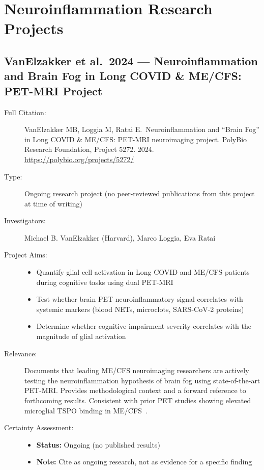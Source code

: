 \section{Neuroinflammation Research Projects}
\label{sec:bib-neuroinflammation-projects-2026}

\subsection{VanElzakker et al.\ 2024 --- Neuroinflammation and Brain Fog in Long COVID \& ME/CFS: PET-MRI Project}

\begin{description}
    \item[Full Citation:] VanElzakker MB, Loggia M, Ratai E.\ Neuroinflammation and ``Brain Fog'' in Long COVID \& ME/CFS: PET-MRI neuroimaging project. PolyBio Research Foundation, Project 5272. 2024. \url{https://polybio.org/projects/5272/} \cite{VanElzakker2024NeuroinflammationProject}
    \item[Type:] Ongoing research project (no peer-reviewed publications from this project at time of writing)
    \item[Investigators:] Michael B. VanElzakker (Harvard), Marco Loggia, Eva Ratai
    \item[Project Aims:]
    \begin{itemize}
        \item Quantify glial cell activation in Long COVID and ME/CFS patients during cognitive tasks using dual PET-MRI
        \item Test whether brain PET neuroinflammatory signal correlates with systemic markers (blood NETs, microclots, SARS-CoV-2 proteins)
        \item Determine whether cognitive impairment severity correlates with the magnitude of glial activation
    \end{itemize}
    \item[Relevance:] Documents that leading ME/CFS neuroimaging researchers are actively testing the neuroinflammation hypothesis of brain fog using state-of-the-art PET-MRI. Provides methodological context and a forward reference to forthcoming results. Consistent with prior PET studies showing elevated microglial TSPO binding in ME/CFS~\cite{Nakatomi2014neuroinflammation}.
    \item[Certainty Assessment:]
    \begin{itemize}
        \item \textbf{Status:} Ongoing (no published results)
        \item \textbf{Note:} Cite as ongoing research, not as evidence for a specific finding
    \end{itemize}
\end{description}

